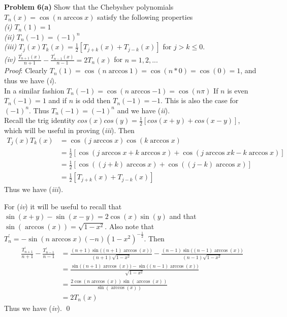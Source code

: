 \documentclass[12pt]{article}
\newcommand{\problem}[1]{\hspace{-4 ex} \large \textbf{Problem #1} }
\renewenvironment{proof}{\hspace{-4 ex} \emph{Proof}:}{\qed}
\begin{document}
\problem{6(a)} Show that the Chebyshev polynomials $T_n(x)=\cos{(n \arccos{x})}$ satisfy the following properties \\
\emph{(i)} $T_n(1) = 1$ \\
\emph{(ii)} $T_n(-1) = (-1)^n$ \\
\emph{(iii)} $T_j(x)T_k(x) = \tfrac{1}{2}[T_{j+k}(x) + T_{j-k}(x)]$ for $j>k\leq 0$. \\
\emph{(iv)} $\frac{T_{n+1}^\prime(x)}{n+1} - \frac{T_{n-1}^\prime(x)}{n-1} = 2T_n(x)$ for $n=1, 2, ...$ \\

	\begin{proof}
		Clearly $T_n(1) = \cos{(n \arccos{1})} = \cos{(n*0)} = \cos{(0)} = 1$, and thus we have (\emph{i}). \\
		
		In a similar fashion $T_n(-1) = \cos{(n \arccos{-1})} = \cos(n\pi)$ If $n$ is even $T_n(-1) = 1$ and if $n$ is odd then $T_n(-1)=-1$. This is also the case for $(-1)^n$. Thus $T_n(-1) = (-1)^n$ and we have (\emph{ii}). \\
		
		Recall the trig identity $cos(x)cos(y) = \tfrac{1}{2}[cos(x+y) + cos(x-y)]$, which will be useful in proving (\emph{iii}). Then
		\begin{align*}
			T_j(x)T_k(x) & = \cos(j \arccos{x}) \cos(k \arccos{x}) \\
			& = \tfrac{1}{2}[ \cos(j \arccos{x} + k \arccos{x}) +  \cos(j \arccos{x} k - k \arccos{x}) ] \\
			& = \tfrac{1}{2}[ \cos( (j + k) \arccos{x}) + \cos( (j - k) \arccos{x}) ]\\
			& = \tfrac{1}{2}[ T_{j+k}(x) + T_{j-k}(x)]
		\end{align*}
		Thus we have (\emph{iii}). \bigbreak
		
		For (\emph{iv}) it will be useful to recall that $\sin(x+y) - \sin(x-y) = 2 \cos(x) \sin(y)$ and that $\sin(\arccos(x)) = \sqrt{1-x^2}$. Also note that $T_n^\prime = -\sin{(n \arccos{x})} (-n)(1-x^2)^{-\frac{1}{2}}$. Then
		\begin{align*}
			\frac{T_{n+1}^\prime}{n+1} - \frac{T_{n-1}^\prime}{n-1} & = \frac{(n+1) \sin\big((n+1) \arccos(x) \big)}{(n+1)\sqrt{1-x^2}} - \frac{(n-1) \sin\big((n-1) \arccos(x) \big)}{(n-1)\sqrt{1-x^2}} \\
			& = \frac{ \sin\big((n+1) \arccos(x) \big) - \sin\big((n-1) \arccos(x) \big) } { \sqrt{1-x^2} } \\
			& =  \frac{2 \cos(n \arccos(x)) \sin(\arccos(x))}{ \sin(\arccos(x))} \\
			& = 2 T_n(x)
		\end{align*}
		Thus we have (\emph{iv}).		
	\end{proof}
\end{document}
